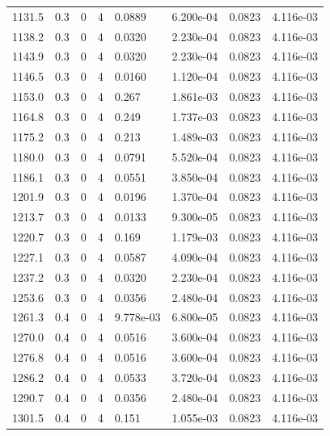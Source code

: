 \documentclass[preview]{standalone}
\begin{document}
{{{{{{{\begin{tabular}{L{1.2cm}C{1.2cm} C{0.3cm}C{0.5cm} C{1.4cm}C{1.4cm} C{1.4cm}C{1.4cm}}
  1131.5  &   0.3  & 0     &  4 &  0.0889  & 6.200e-04  & 0.0823 &  4.116e-03   \\ 
  1138.2  &   0.3  & 0     &  4 &  0.0320  & 2.230e-04  & 0.0823 &  4.116e-03   \\ 
  1143.9  &   0.3  & 0     &  4 &  0.0320  & 2.230e-04  & 0.0823 &  4.116e-03   \\ 
  1146.5  &   0.3  & 0     &  4 &  0.0160  & 1.120e-04  & 0.0823 &  4.116e-03   \\ 
  1153.0  &   0.3  & 0     &  4 &  0.267  & 1.861e-03  & 0.0823 &  4.116e-03   \\ 
  1164.8  &   0.3  & 0     &  4 &  0.249  & 1.737e-03  & 0.0823 &  4.116e-03   \\ 
  1175.2  &   0.3  & 0     &  4 &  0.213  & 1.489e-03  & 0.0823 &  4.116e-03   \\ 
  1180.0  &   0.3  & 0     &  4 &  0.0791  & 5.520e-04  & 0.0823 &  4.116e-03   \\ 
  1186.1  &   0.3  & 0     &  4 &  0.0551  & 3.850e-04  & 0.0823 &  4.116e-03   \\ 
  1201.9  &   0.3  & 0     &  4 &  0.0196  & 1.370e-04  & 0.0823 &  4.116e-03   \\ 
  1213.7  &   0.3  & 0     &  4 &  0.0133  & 9.300e-05  & 0.0823 &  4.116e-03   \\ 
  1220.7  &   0.3  & 0     &  4 &  0.169  & 1.179e-03  & 0.0823 &  4.116e-03   \\ 
  1227.1  &   0.3  & 0     &  4 &  0.0587  & 4.090e-04  & 0.0823 &  4.116e-03   \\ 
  1237.2  &   0.3  & 0     &  4 &  0.0320  & 2.230e-04  & 0.0823 &  4.116e-03   \\ 
  1253.6  &   0.3  & 0     &  4 &  0.0356  & 2.480e-04  & 0.0823 &  4.116e-03   \\ 
  1261.3  &   0.4  & 0     &  4 &  9.778e-03  & 6.800e-05  & 0.0823 &  4.116e-03   \\ 
  1270.0  &   0.4  & 0     &  4 &  0.0516  & 3.600e-04  & 0.0823 &  4.116e-03   \\ 
  1276.8  &   0.4  & 0     &  4 &  0.0516  & 3.600e-04  & 0.0823 &  4.116e-03   \\ 
  1286.2  &   0.4  & 0     &  4 &  0.0533  & 3.720e-04  & 0.0823 &  4.116e-03   \\ 
  1290.7  &   0.4  & 0     &  4 &  0.0356  & 2.480e-04  & 0.0823 &  4.116e-03   \\ 
  1301.5  &   0.4  & 0     &  4 &  0.151  & 1.055e-03  & 0.0823 &  4.116e-03   \\ 

\end{tabular}}}}}}}}
\end{document}
